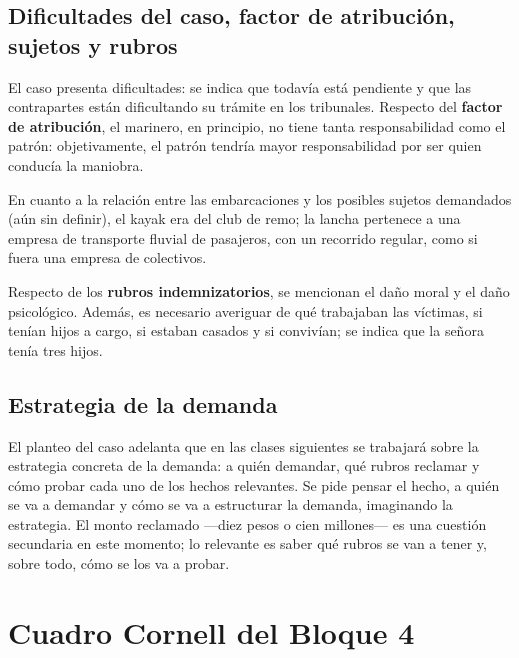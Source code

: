 \documentclass[12pt,oneside]{book}
\begin{document}
\subsection{Dificultades del caso, factor de atribución, sujetos y rubros}

El caso presenta dificultades: se indica que todavía está pendiente y que las contrapartes están dificultando su trámite en los tribunales. Respecto del \textbf{factor de atribución}, el marinero, en principio, no tiene tanta responsabilidad como el patrón: objetivamente, el patrón tendría mayor responsabilidad por ser quien conducía la maniobra.

En cuanto a la relación entre las embarcaciones y los posibles sujetos demandados (aún sin definir), el kayak era del club de remo; la lancha pertenece a una empresa de transporte fluvial de pasajeros, con un recorrido regular, como si fuera una empresa de colectivos.

Respecto de los \textbf{rubros indemnizatorios}, se mencionan el daño moral y el daño psicológico. Además, es necesario averiguar de qué trabajaban las víctimas, si tenían hijos a cargo, si estaban casados y si convivían; se indica que la señora tenía tres hijos.

\subsection{Estrategia de la demanda}

El planteo del caso adelanta que en las clases siguientes se trabajará sobre la estrategia concreta de la demanda: a quién demandar, qué rubros reclamar y cómo probar cada uno de los hechos relevantes. Se pide pensar el hecho, a quién se va a demandar y cómo se va a estructurar la demanda, imaginando la estrategia. El monto reclamado ---diez pesos o cien millones--- es una cuestión secundaria en este momento; lo relevante es saber qué rubros se van a tener y, sobre todo, cómo se los va a probar.

\clearpage
\section{Cuadro Cornell del Bloque 4}
\end{document}
